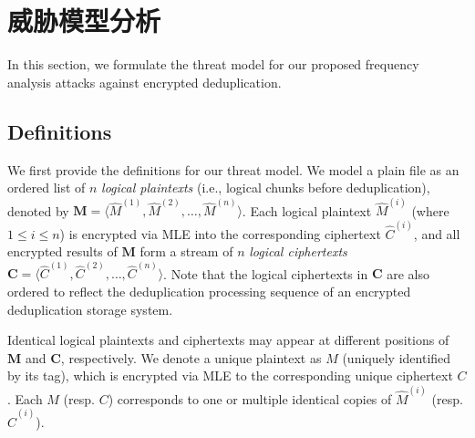 \chapter{威胁模型分析}
\label{sec:ThreatModel}

In this section, we formulate the threat model for our proposed frequency
analysis attacks against encrypted deduplication.  

\section{Definitions}
\label{sec:ThreatModel-Definitions}

We first provide the definitions for our threat model. We model a plain file
as an ordered list of $n$ {\em logical plaintexts} (i.e., logical chunks
before deduplication), denoted by $\mathbf{M} = \langle \hat{M}^{(1)},
\hat{M}^{(2)}, \ldots, \hat{M}^{(n)}\rangle$.  Each logical plaintext
$\hat{M}^{(i)}$ (where $1\le i\le n$) is encrypted via MLE into the
corresponding ciphertext $\hat{C}^{(i)}$, and all encrypted results of
$\mathbf{M}$ form a stream of $n$ {\em logical ciphertexts} $\mathbf{C} =
\langle \hat{C}^{(1)}, \hat{C}^{(2)}, \ldots, \hat{C}^{(n)} \rangle$.  Note
that the logical ciphertexts in $\mathbf{C}$ are also ordered to reflect the
deduplication processing sequence of an encrypted deduplication storage
system.  

Identical logical plaintexts and ciphertexts may appear at different positions
of $\mathbf{M}$ and $\mathbf{C}$, respectively.  We denote a unique plaintext
as $M$ (uniquely identified by its tag), which is encrypted via MLE to the
corresponding unique ciphertext $C$.  Each $M$ (resp. $C$) corresponds to one
or multiple identical copies of $\hat{M}^{(i)}$ (resp. $\hat{C}^{(i)}$).  



